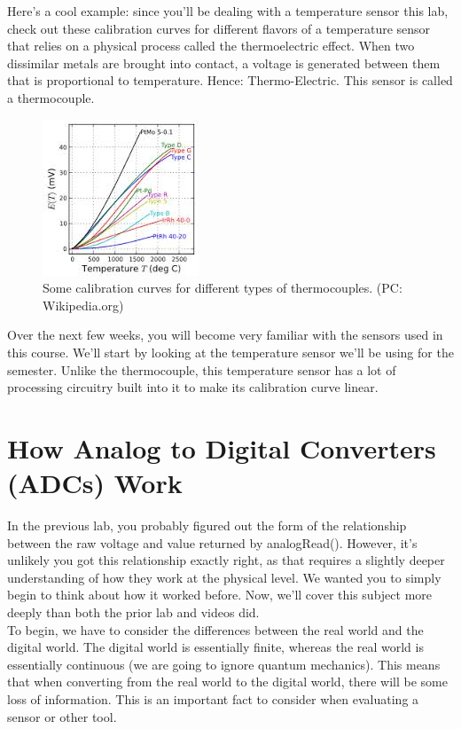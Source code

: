 \documentclass[12pt]{article}
\begin{document}
	Here's a cool example: since you'll be dealing with a temperature sensor this lab, check out these calibration curves for different flavors of a temperature sensor that relies on a physical process called the thermoelectric effect. When two dissimilar metals are brought into contact, a voltage is generated between them that is proportional to temperature. Hence: Thermo-Electric. This sensor is called a thermocouple. \\
	
	\begin{figure}[h]
		\begin{center}
			\includegraphics{Figures/thermocouple.jpg}
			\caption{Some calibration curves for different types of thermocouples. (PC: Wikipedia.org)}
		\end{center}
	\end{figure}
    
	Over the next few weeks, you will become very familiar with the sensors used in this course. We'll start by looking at the temperature sensor we'll be using for the semester. Unlike the thermocouple, this temperature sensor has a lot of processing circuitry built into it to make its calibration curve linear.
	
	\section*{How Analog to Digital Converters (ADCs) Work}
	In the previous lab, you probably figured out the form of the relationship between the raw voltage and value returned by analogRead(). However, it's unlikely you got this relationship exactly right, as that requires a slightly deeper understanding of how they work at the physical level. We wanted you to simply begin to think about how it worked before. Now, we'll cover this subject more deeply than both the prior lab and videos did.
	\\
	
	To begin, we have to consider the differences between the real world and the digital world. The digital world is essentially finite, whereas the real world is essentially continuous (we are going to ignore quantum mechanics). This means that when converting from the real world to the digital world, there will be some loss of information. This is an important fact to consider when evaluating a sensor or other tool.
	\\
	
\end{document}
